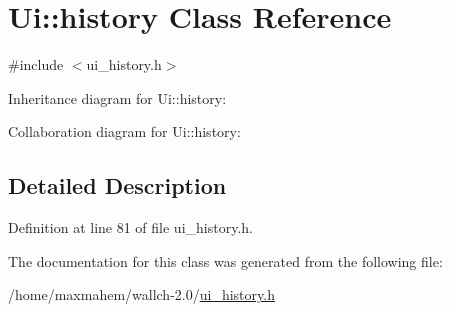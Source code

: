 \hypertarget{classUi_1_1history}{
\section{Ui::history Class Reference}
\label{classUi_1_1history}
}


{\ttfamily \#include $<$ui\_\-history.h$>$}



Inheritance diagram for Ui::history:


Collaboration diagram for Ui::history:


\subsection{Detailed Description}


Definition at line 81 of file ui\_\-history.h.



The documentation for this class was generated from the following file:\begin{DoxyCompactItemize}
\item 
/home/maxmahem/wallch-\/2.0/\hyperlink{ui__history_8h}{ui\_\-history.h}\end{DoxyCompactItemize}
